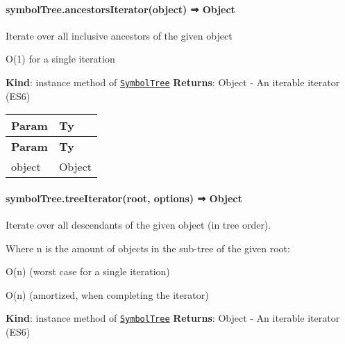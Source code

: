 \label{_module_symbol-tree--SymbolTree+ancestorsIterator}%


\paragraph*{symbol\+Tree.\+ancestors\+Iterator(object) ⇒ {\ttfamily Object}}

Iterate over all inclusive ancestors of the given object


\begin{DoxyItemize}
\item {\ttfamily O(1)} for a single iteration
\end{DoxyItemize}

{\bfseries Kind}\+: instance method of {\ttfamily \href{#exp_module_symbol-tree--SymbolTree}{\tt Symbol\+Tree}} {\bfseries Returns}\+: {\ttfamily Object} -\/ An iterable iterator (E\+S6)

\tabulinesep=1mm
\begin{longtabu} spread 0pt [c]{*{2}{|X[-1]}|}
\hline
\rowcolor{\tableheadbgcolor}\textbf{ Param  }&\textbf{ Ty   }\\
\endfirsthead
\hline
\endfoot
\hline
\rowcolor{\tableheadbgcolor}\textbf{ Param  }&\textbf{ Ty   }\\
\endhead
object  &{\ttfamily Object}   \\
\end{longtabu}


\label{_module_symbol-tree--SymbolTree+treeIterator}%


\paragraph*{symbol\+Tree.\+tree\+Iterator(root, options) ⇒ {\ttfamily Object}}

Iterate over all descendants of the given object (in tree order).

Where {\ttfamily n} is the amount of objects in the sub-\/tree of the given {\ttfamily root}\+:


\begin{DoxyItemize}
\item {\ttfamily O(n)} (worst case for a single iteration)
\item {\ttfamily O(n)} (amortized, when completing the iterator)
\end{DoxyItemize}

{\bfseries Kind}\+: instance method of {\ttfamily \href{#exp_module_symbol-tree--SymbolTree}{\tt Symbol\+Tree}} {\bfseries Returns}\+: {\ttfamily Object} -\/ An iterable iterator (E\+S6)

